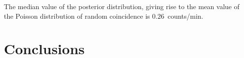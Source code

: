 The median value of the posterior distribution, giving rise to the mean value of the Poisson distribution of random coincidence is $0.26$~counts/min.


\section{Conclusions}\label{sec:HS_14008_conclusion}
